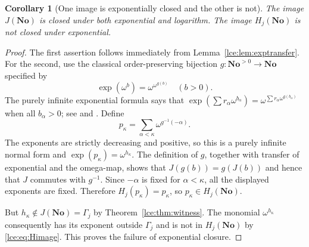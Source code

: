 \documentclass[11pt,letterpaper]{article}
\numberwithin{equation}{section}
\newtheorem{corollary}[theorem]{Corollary}
\theoremstyle{definition}
\theoremstyle{remark}
\newcommand{\No}{\mathbf{No}}
\newcommand{\Gam}{\Gamma_j}
\newcommand{\thref}[1]{Theorem~\ref{#1}}
\newcommand{\leref}[1]{Lemma~\ref{#1}}
\begin{document}
\begin{corollary}[One image is exponentially closed and the other is not]
\label{lce:cor:Hnotexp}
The image $J(\No)$ is closed under both exponential and logarithm.
The image $H_j(\No)$ is not closed under exponential.
\end{corollary}
\begin{proof}
The first assertion follows immediately from \leref{lce:lem:exptransfer}.
For the second, use the classical order-preserving bijection
$g:\No^{>0}\to\No$ specified by
\[
 \exp(\omega^b)=\omega^{\omega^{g(b)}}\quad(b>0).
\]
The purely infinite exponential formula says that
$\exp(\sum r_\alpha\omega^{b_\alpha})
=\omega^{\sum r_\alpha\omega^{g(b_\alpha)}}$ when all $b_\alpha>0$;
see \cite[Theorem~10.13]{Gonshor} and \cite[Lemma~5.2, proof]{vdDE}.
Define
\[
 p_\kappa=\sum_{\alpha<\kappa}\omega^{g^{-1}(-\alpha)}.
\]
The exponents are strictly decreasing and positive, so this is a purely
infinite normal form and $\exp(p_\kappa)=\omega^{h_\kappa}$.
The definition of $g$, together with transfer of exponential and the
omega-map, shows that $J(g(b))=g(J(b))$ and hence that $J$ commutes with
$g^{-1}$. Since $-\alpha$ is fixed for $\alpha<\kappa$, all the displayed
exponents are fixed. Therefore $H_j(p_\kappa)=p_\kappa$, so
$p_\kappa\in H_j(\No)$.

But $h_\kappa\notin J(\No)=\Gam$ by \thref{lce:thm:witness}.
The monomial $\omega^{h_\kappa}$ consequently has its exponent outside
$\Gam$ and is not in $H_j(\No)$ by \eqref{lce:eq:Himage}.
This proves the failure of exponential closure.
\end{proof}
\end{document}
